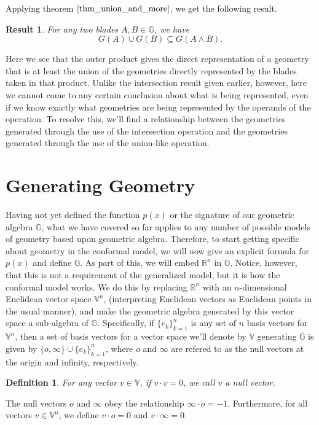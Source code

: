 \documentclass[12pt]{article}
\newcommand{\G}{\mathbb{G}}
\newcommand{\V}{\mathbb{V}}
\newcommand{\R}{\mathbb{R}}
\newcommand{\nvao}{o}
\newcommand{\nvai}{\infty}
\newtheorem{definition}{Definition}[section]
\newtheorem{result}{Result}[section]
\begin{document}
Applying theorem $\eqref{thm_union_and_more}$, we get the following result.
\begin{result}\label{rslt_union_and_more}
For any two blades $A,B\in\G$, we have
\begin{equation*}
G(A)\cup G(B)\subseteq G(A\wedge B).
\end{equation*}
\end{result}
Here we see that the outer product gives the direct representation
of a geometry that is at least the union of the geometries directly
represented by the blades taken in that product.  Unlike the intersection
result given earlier, however, here we cannot come to any certain conclusion
about what is being represented, even if we know exactly what
geometries are being represented by the operands of the operation.
To resolve this, we'll find a relationship between the geometries
generated through the use of the intersection operation and the geometries
generated through the use of the union-like operation.

\section{Generating Geometry}

Having not yet defined the function $p(x)$ or the signature of our
geometric algebra $\G$, what we have covered so far applies to
any number of possible models of geometry based upon geometric algebra.
Therefore, to start getting specific about geometry in the conformal model,
we will now give an explicit formula for $p(x)$ and define $\G$.
As part of this, we will embed $\R^n$ in $\G$.  Notice, however, that
this is not a requirement of the generalized model, but it is how
the conformal model works.
We do this by replacing $\R^n$
with an $n$-dimensional Euclidean vector space $\V^n$, (interpreting
Euclidean vectors as Euclidean points in the usual manner), and
make the geometric algebra generated by this vector space
a sub-algebra of $\G$.  Specifically, if $\{e_k\}_{k=1}^n$ is
any set of $n$ basis vectors for $\V^n$, then a set of
basis vectors for a vector space we'll denote by $\V$ generating $\G$
is given by $\{\nvao,\nvai\}\cup\{e_k\}_{k=1}^n$, where $\nvao$ and $\nvai$ are
refered to as the null vectors
at the origin and infinity, respectively.
\begin{definition}
For any vector $v\in\V$, if $v\cdot v=0$, we call $v$ a null vector.
\end{definition}
The null vectors $\nvao$ and $\nvai$ obey the relationship
$\nvai\cdot\nvao=-1$.  Furthermore, for
all vectors $v\in\V^n$, we define $v\cdot\nvao=0$ and $v\cdot\nvai=0$.
\end{document}
